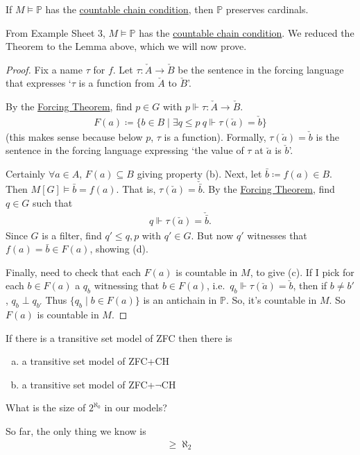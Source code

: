 \documentclass{article}
\newcommand{\p}{\mathbb{P}}
\newcommand{\1}{\mathbbm{1}}
\let\models\vDash
\let\forces\Vdash
\begin{document}
\begin{thm}
  If $M \models \p$ has the \hyperlink{def:ccc}{countable chain condition}, then $\p$ preserves cardinals.
\end{thm}
From Example Sheet 3, $M \models \p$ has the \hyperlink{def:ccc}{countable chain condition}.
We reduced the Theorem to the Lemma above, which we will now prove.
\begin{proof}
  Fix a name $\tau$ for $f$.
  Let $\tau: \check{A} \to \check{B}$ be the sentence in the forcing language that expresses `$\tau$ is a function from $\check{A}$ to $\check{B}$'.

  By the \hyperlink{thm:forcing}{Forcing Theorem}, find $p \in G$ with $p \forces \tau: \check{A} \to \check{B}$.
  \begin{align*}
    F(a) \coloneqq \{b \in B \mid \exists q \leq p \ q \forces \tau(\check{a}) = \check{b}\}
  \end{align*}
  (this makes sense because below $p$, $\tau$ is a function). Formally, $\tau(\check{a}) = \check{b}$ is the sentence in the forcing language expressing `the value of $\tau$ at $\check{a}$ is $\check{b}$'.

  Certainly $\forall a \in A$, $F(a) \subseteq B$ giving property (b). Next, let $\bar{b} \coloneqq f(a) \in B$. Then $M[G] \models \bar{b} = f(a)$. That is, $\tau(\check{a}) = \check{\bar{b}}$.
  By the \hyperlink{thm:forcing}{Forcing Theorem}, find $q \in G$ such that
  \begin{align*}
    q \forces \tau(\check{a}) = \check{\bar{b}}.
  \end{align*}
  Since $G$ is a filter, find $q' \leq q,p$ with $q' \in G$.
  But now $q'$ witnesses that $f(a) = \bar{b} \in F(a)$, showing (d).

  Finally, need to check that each $F(a)$ is countable in $M$, to give (c).
  If I pick for each $b \in F(a)$ a $q_b$ witnessing that $b \in F(a)$, i.e.\ $q_b \forces \tau(\check{a}) = \check{b}$, then if $b \neq b'$, $q_b \perp q_{b'}$
  Thus $\{q_b \mid b \in F(a)\}$ is an antichain in $\p$.
  So, it's countable in $M$.
  So $F(a)$ is countable in $M$.
\end{proof}
\begin{cor}
  If there is a transitive set model of \textsf{ZFC} then there is
  \begin{enumerate}[(a)]
    \item a transitive set model of \textsf{ZFC+CH}
    \item a transitive set model of \textsf{ZFC+$\neg$CH}
  \end{enumerate}
\end{cor}
\begin{question}
  What is the size of $2^{\aleph_0}$ in our models?
\end{question}
So far, the only thing we know is
\begin{align*}
  \geq \aleph_2
\end{align*}
\end{document}

